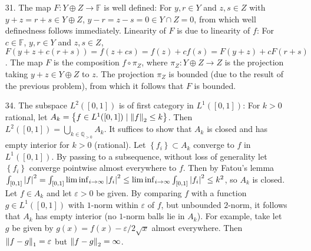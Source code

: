 \documentclass[11pt,leqno]{article}
\theoremstyle{plain}
\theoremstyle{definition}
\numberwithin{equation}{section}
\numberwithin{lem}{section}
\newcommand{\cbr}[1]{\left\{#1\right\}}
\begin{document}
\begin{enumerate}
  \item[31.] The map $F\colon Y\oplus Z\to \mathbb F$ is well defined: For $y,r\in Y$ and $z,s\in Z$ with $y+z = r+s\in Y\oplus Z$, $y-r = z-s = 0\in Y\cap Z = 0$, from which well definedness follows immediately. Linearity of $F$ is due to linearity of $f$: For $c\in \mathbb F$, $y,r\in Y$ and $z,s\in Z$, $F(y+z + c(r+s)) = f(z+cs) = f(z)+cf(s) = F(y+z)+ cF(r+s)$. The map $F$ is the composition $f\circ \pi_Z$, where $\pi_Z\colon Y\oplus Z\to Z$ is the projection taking $y+z\in Y\oplus Z$ to $z$. The projection $\pi_Z$ is bounded (due to the result of the previous problem), from which it follows that $F$ is bounded.
  
  \item[34.] The subspace $L^2([0,1])$ is of first category in $L^1([0,1])$: For $k>0$ rational, let $A_k = \cbr{f\in L^1([0,1])\mid \norm{f}_2\leq k}$. Then $L^2([0,1]) = \bigcup_{k\in\mathbb Q_{>0}}A_k$. It suffices to show that $A_k$ is closed and has empty interior for $k>0$ (rational). Let $\cbr{f_i}\subset A_k$ converge to $f$ in $L^1([0,1])$. By passing to a subsequence, without loss of generality let $\cbr{f_i}$ converge pointwise almost everywhere to $f$. Then by Fatou's lemma $\int_{[0,1]}\abs{f}^2 = \int_{[0,1]}\liminf_{i\to\infty}\abs{f_i}^2 \leq \liminf_{i\to\infty}\int_{[0,1]}\abs{f_i}^2\leq k^2$, so $A_k$ is closed. Let $f\in A_k$ and let $\varepsilon>0$ be given. By comparing $f$ with a function $g\in L^1([0,1])$ with $1$-norm within $\varepsilon$ of $f$, but unbounded $2$-norm, it follows that $A_k$ has empty interior (no $1$-norm balls lie in $A_k$). For example, take let $g$ be given by $g(x) = f(x)-\varepsilon/2\sqrt{x}$ almost everywhere. Then $\norm{f-g}_1 = \varepsilon$ but $\norm{f-g}_2 = \infty$.
\end{enumerate}
\end{document}
